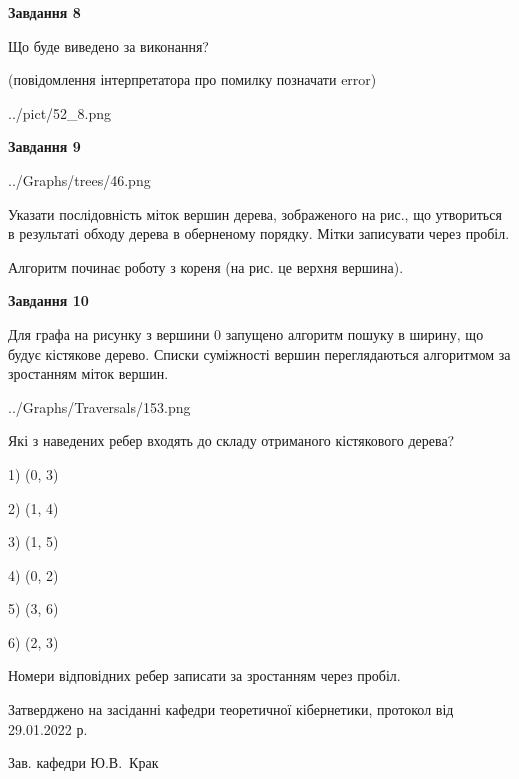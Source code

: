 \documentclass[12pt, ukrainian]{article}
\begin{document}
{\begin {large}
{\begin {center}\textbf{Завдання 8}\end {center}}\par
Що буде виведено за виконання?\par
 (повідомлення інтерпретатора про помилку позначати error)\par
\begin{center}
	{../pict/52_8.png}
\end{center}
\newpage

{\begin {center}\textbf{Завдання 9}\end {center}}\par

\begin{center}
	{../Graphs/trees/46.png}
\end{center}
Указати послідовність міток вершин дерева, зображеного на рис., що утвориться в результаті обходу дерева в оберненому порядку. Мітки записувати через пробіл.\par Алгоритм починає роботу з кореня (на рис. це верхня вершина).\par
\newpage

{\begin {center}\textbf{Завдання 10}\end {center}}\par
Для графа на рисунку з вершини 0 запущено алгоритм пошуку в ширину, що будує кістякове дерево. Списки суміжності вершин переглядаються алгоритмом за зростанням міток вершин.\par
\begin{center}
	{../Graphs/Traversals/153.png}
\end{center}
\par Які з наведених ребер входять до складу отриманого кістякового дерева?\par
1) (0, 3)\par
2) (1, 4)\par
3) (1, 5)\par
4) (0, 2)\par
5) (3, 6)\par
6) (2, 3)\par
{\vskip 15pt} Номери відповідних ребер записати за зростанням через пробіл.\par
\newpage


\end {large}
}
{\smallskip \begin {small} Затверджено на засіданні кафедри теоретичної кібернетики, протокол  від   29.01.2022 р.\par\smallskip\smallskip
{\parbox {6.5 cm}{Зав. кафедри \dotfill Ю.В.~Крак}} \end{small}}
\end{document}
